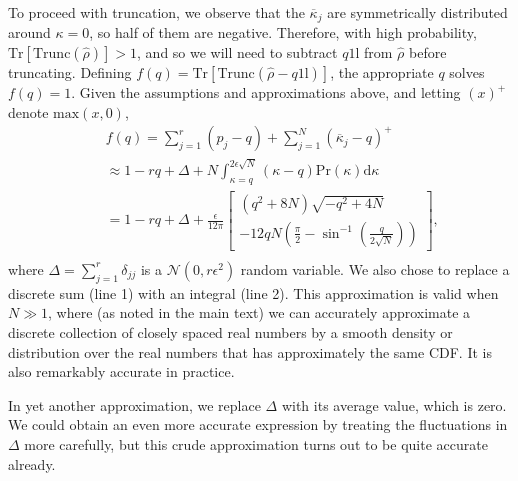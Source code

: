 \documentclass[aps,pra, twocolumn]{revtex4}
\newcommand{\Tr}{\mathrm{Tr}}
\def\Id{1\!\mathrm{l}}
\begin{document}
To proceed with truncation, we observe that the $\overline{\kappa}_j$ are symmetrically distributed around $
\kappa=0$, so half of them are negative.  Therefore, with high probability, $\Tr
\left[\mathrm{Trunc}(\hat\rho)\right]>1$, and so we will need to subtract $q\Id$ from $\hat\rho$ before truncating.
Defining $f(q) = \Tr\left[\mathrm{Trunc}(\hat\rho - q \Id)\right]$, the appropriate $q$ solves $f(q) = 1$. Given the assumptions and approximations above, and letting $(x)^{+}$ denote $\mathrm{max}(x,0)$, 
\begin{eqnarray}
\nonumber &&f(q) = \sum_{j=1}^{r}(p_j - q) + \sum_{j=1}^{N}{(\overline{\kappa}_j-q)^+} \\
\nonumber &&\approx 1 - rq + \Delta + N\int_{\kappa=q}^{2\epsilon\sqrt{N}}{(\kappa-q)\mathrm{Pr}(\kappa)\mathrm{d}\kappa}\\
&&= 1 - rq + \Delta + \frac{\epsilon}{12\pi}\left[
\begin{array}{l} (q^2+8N)\sqrt{-q^2+4N} \\
-12qN\left(\frac{\pi}{2}-\sin^{-1}\left(\frac{q}{2\sqrt{N}}\right)\right)
\end{array}\right],\nonumber\\
~
\end{eqnarray}
where $\Delta = \sum_{j=1}^{r}\delta_{jj}$ is a $\mathcal{N}(0,r\epsilon^2)$ random variable.  We also chose to replace a discrete 
sum (line 1) with an integral (line 2).  This approximation is valid when $N\gg1$, where (as noted in the main text) we can accurately approximate a discrete collection of closely spaced real numbers by a smooth density or distribution over the real numbers that has approximately the same CDF.  It is also remarkably accurate in practice.
  
In yet another approximation, we replace $\Delta$ with its average value, which is zero.  We could obtain an even more accurate expression 
 by treating the fluctuations in $\Delta$ more carefully, but this crude approximation turns out to be quite accurate already.
\end{document}
